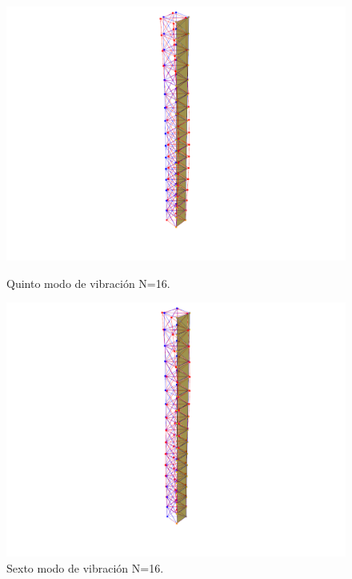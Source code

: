 \begin{figure}[H]
    \begin{minipage}[b]{0.5\textwidth}
        \centering
        \includegraphics[width=\textwidth]{FOTOS/mod5_16.png}
        \caption{Quinto modo de vibración N=16.}
    \end{minipage}
    \hfill
    \begin{minipage}[b]{0.5\textwidth}
        \centering
        \includegraphics[width=\textwidth]{FOTOS/mod6_16.png}
        \caption{Sexto modo de vibración N=16.}
    \end{minipage}
\end{figure}

